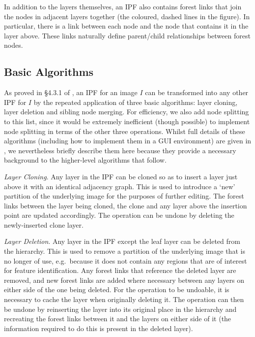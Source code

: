 \documentclass[10pt,twocolumn,twoside]{IEEEtran}
\begin{document}
In addition to the layers themselves, an IPF also contains forest links that join the nodes in adjacent layers together (the coloured, dashed lines in the figure). In particular, there is a link between each node and the node that contains it in the layer above. These links naturally define parent/child relationships between forest nodes.

\subsection{Basic Algorithms}

As proved in \S4.3.1 of \cite{golodetz11}, an IPF for an image $I$ can be transformed into any other IPF for $I$ by the repeated application of three basic algorithms: layer cloning, layer deletion and sibling node merging. For efficiency, we also add node splitting to this list, since it would be extremely inefficient (though possible) to implement node splitting in terms of the other three operations. Whilst full details of these algorithms (including how to implement them in a GUI environment) are given in \cite{golodetz11}, we nevertheless briefly describe them here because they provide a necessary background to the higher-level algorithms that follow.

\afterpage{\clearpage}

\emph{Layer Cloning}. Any layer in the IPF can be cloned so as to insert a layer just above it with an identical adjacency graph. This is used to introduce a `new' partition of the underlying image for the purposes of further editing. The forest links between the layer being cloned, the clone and any layer above the insertion point are updated accordingly. The operation can be undone by deleting the newly-inserted clone layer.

\emph{Layer Deletion}. Any layer in the IPF except the leaf layer can be deleted from the hierarchy. This is used to remove a partition of the underlying image that is no longer of use, e.g.~because it does not contain any regions that are of interest for feature identification. Any forest links that reference the deleted layer are removed, and new forest links are added where necessary between any layers on either side of the one being deleted. For the operation to be undoable, it is necessary to cache the layer when originally deleting it. The operation can then be undone by reinserting the layer into its original place in the hierarchy and recreating the forest links between it and the layers on either side of it (the information required to do this is present in the deleted layer).
\end{document}
